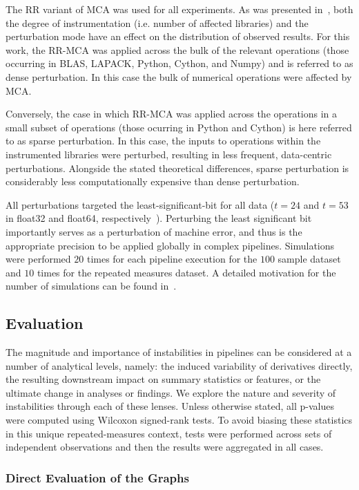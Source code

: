 \documentclass[fleqn,10pt]{SelfArx} %
\newcommand{\new}[1]{{#1}}
\begin{document}
The RR variant of MCA was used for all experiments. As was presented in~\cite{Kiar2020-lb}, both the degree of
instrumentation (i.e. number of affected libraries) and the perturbation mode have an effect on the distribution of
observed results. For this work, the RR-MCA was applied across the bulk of the relevant operations (those occurring
in BLAS, LAPACK, Python, Cython, and Numpy) and is referred to as dense perturbation. In this case the bulk of
numerical operations were affected by MCA.

Conversely, the case in which RR-MCA was applied across the operations in a small subset of operations (those ocurring
in Python and Cython) is here referred to as sparse perturbation. In this case, the inputs to operations within the
instrumented libraries were perturbed, resulting in less frequent, data-centric perturbations. Alongside the stated theoretical
differences, sparse perturbation is considerably less computationally expensive than dense perturbation.

All perturbations targeted the least-significant-bit for all data ($t=24$ and $t=53$ in float32 and float64,
respectively~\cite{Denis2016-wo}). Perturbing the least significant bit importantly serves as a perturbation of
machine error, and thus is the appropriate precision to be applied globally in complex pipelines. Simulations were
performed $20$ times for each pipeline execution for the $100$ sample dataset and $10$ times for the repeated
measures dataset. A detailed motivation for the number of simulations can be found in~\cite{Sohier2018-ts}.

\subsection*{Evaluation}

The magnitude and importance of instabilities in pipelines can be considered at a number of analytical levels, namely:
the induced variability of derivatives directly, the resulting downstream impact on summary statistics or features, or
the ultimate change in analyses or findings. We explore the nature and severity of instabilities through each of these
lenses. Unless otherwise stated, all p-values were computed using Wilcoxon signed-rank tests. \new{To avoid biasing
these statistics in this unique repeated-measures context, tests were performed across sets of independent
observations and then the results were aggregated in all cases.}

\subsubsection*{Direct Evaluation of the Graphs}
\end{document}
